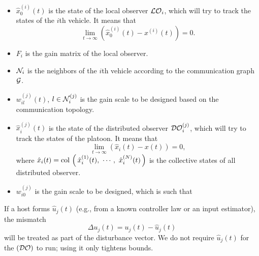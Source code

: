 \begin{itemize}
    \item $\hat{x}_{0}^{(i)}(t)$ is the state of the local observer $\mathcal{LO}_{i}$, which will try to track the states of the $i$th vehicle. It means that
    \begin{equation}
        \lim_{t \rightarrow \infty} \left( \hat{x}_{0}^{(i)}(t) - x^{(i)}(t) \right)= 0. 
        \label{eq_hatx_0}
    \end{equation}
    \item $F_{i}$ is the gain matrix of the local observer. 
    \item ${\mathcal{N}}_{i}$ is the neighbors of the $i$th vehicle according to the communication graph $\mathcal{G}$.%
    \item {$w_{i l}^{(j)}(t)$, $l \in \mathcal{N}_{i}^{(j)}$ is the gain scale to be designed based on the communication topology.}
    \item $\hat{x}^{(j)}_i(t)$ is the state of the distributed observer $\mathcal{DO}_{i}^{(j)}$, which will try to track the states of the platoon. It means that 
    \begin{equation}
        \lim_{t \rightarrow \infty} \left( \hat{x}_i(t) - x(t) \right)= 0,
        \label{eq_hatx_i}
    \end{equation}
    where $\hat{x}_i(t) = \mathop{{\rm col}\,\left(\,\hat{x}^{(1)}_i(t) , \ \cdots , \ \hat{x}^{(N)}_i(t) \,\right)}$ is the collective states of all distributed observer.
    \item $w_{i 0}^{(j)}$ is the gain scale to be designed, which is such that
\end{itemize}




\begin{remark}\label{rem1}
If a host forms $\hat{u}_j(t)$ (e.g., from a known controller law or an input estimator), the mismatch 
\begin{equation}
    \Delta u_j(t) = u_j(t) - \hat{u}_j(t)
\end{equation}
will be treated as part of the disturbance vector. %
We do not require $\hat{u}_j(t)$ for the $(\mathcal{DO})$ to run; using it only tightens bounds.
\end{remark}




